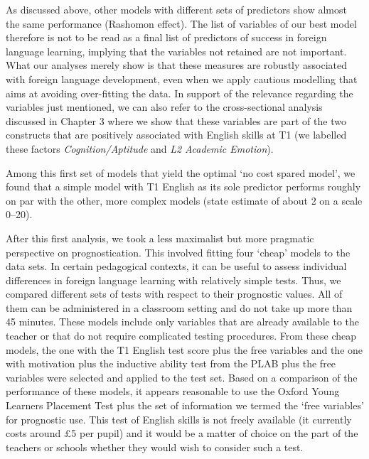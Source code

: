 \documentclass[output=paper]{langsci/langscibook}
\begin{document}
As discussed above, other models with different sets of predictors show almost the same performance (Rashomon effect). The list of variables of our best model therefore is not to be read as a final list of predictors of success in foreign language learning, implying that the variables not retained are not important. What our analyses merely show is that these measures are robustly associated with foreign language development, even when we apply cautious modelling that aims at avoiding over-fitting the data. In support of the relevance regarding the variables just mentioned, we can also refer to the cross-sectional analysis discussed in Chapter 3 where we show that these variables are part of the two constructs that are positively associated with English skills at T1 (we labelled these factors \textit{Cognition/Aptitude} and \textit{L2} \textit{Academic Emotion}).

Among this first set of models that yield the optimal ‘no cost spared model’, we found that a simple model with T1 English as its sole predictor performs roughly on par with the other, more complex models (state estimate of about 2 on a scale 0--20). 

After this first analysis, we took a less maximalist but more pragmatic perspective on prognostication. This involved fitting four ‘cheap’ models to the data sets. In certain pedagogical contexts, it can be useful to assess individual differences in foreign language learning with relatively simple tests. Thus, we compared different sets of tests with respect to their prognostic values. All of them can be administered in a classroom setting and do not take up more than 45 minutes. These models include only variables that are already available to the teacher or that do not require complicated testing procedures. From these cheap models, the one with the T1 English test score plus the free variables and the one with motivation plus the inductive ability test from the PLAB plus the free variables were selected and applied to the test set. Based on a comparison of the performance of these models, it appears reasonable to use the Oxford Young Learners Placement Test plus the set of information we termed the ‘free variables’ for prognostic use. This test of English skills is not freely available (it currently costs around £5 per pupil) and it would be a matter of choice on the part of the teachers or schools whether they would wish to consider such a test. 
\end{document}
